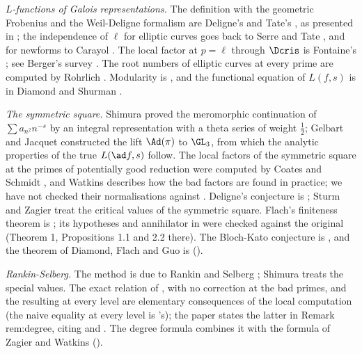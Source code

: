 \emph{$L$-functions of Galois representations.} The definition with the geometric Frobenius and the Weil-Deligne formalism are Deligne's \cite{Deligne73} and Tate's
\cite{Tate79}, as presented in ; the independence of $\ell$ for elliptic curves goes back to Serre and Tate \cite{SerreTate68}, and for newforms to Carayol
\cite{Carayol86}. The local factor at $p=\ell$ through $\Dcris$ is Fontaine's \cite{Fontaine}; see Berger's survey \cite{Berger}. The root numbers of elliptic curves at every prime
are computed by Rohrlich \cite{Rohrlich94}. Modularity is \cite{Wiles95,TaylorWiles,BCDT}, and the functional equation of $L(f,s)$ is in Diamond and Shurman
\cite[Section 5.10]{DiamondShurman}.

\emph{The symmetric square.} Shimura \cite{Shimura75} proved the meromorphic continuation of $\sum a_{n^2}n^{-s}$ by an integral representation with a theta series of weight
$\frac12$; Gelbart and Jacquet \cite{GelbartJacquet} constructed the lift $\Ad(\pi)$ to $\GL_3$, from which the analytic properties of the true $L(\ad f,s)$ follow. The local
factors of the symmetric square at the primes of potentially good reduction were computed by Coates and Schmidt \cite{CoatesSchmidt87}, and Watkins \cite{Watkins02}
describes how the bad factors are found in practice; we have not checked their normalisations against . Deligne's conjecture is
\cite{Deligne79}; Sturm \cite{Sturm80} and Zagier \cite{Zagier85} treat the critical values of the symmetric square. Flach's finiteness theorem is \cite[Theorem 1]{Flach92}; its
hypotheses and annihilator in  were checked against the original (Theorem 1, Propositions 1.1 and 2.2 there). The Bloch-Kato conjecture is \cite{BlochKato}, and the theorem of
Diamond, Flach and Guo is \cite{DFG04} ().

\emph{Rankin-Selberg.} The method is due to Rankin \cite{Rankin39} and Selberg \cite{Selberg40}; Shimura \cite{Shimura76} treats the special values. The exact relation of
, with no correction at the bad primes, and the resulting  at every level are elementary
consequences of the local computation (the naive equality at every level is 's); the paper states the latter in Remark rem:degree, citing \cite{Rankin39,Shimura76} and \cite[Lemma 2.12]{DFG04}. The degree formula
combines it with the formula of Zagier \cite{Zagier85} and Watkins \cite{Watkins02} ().

